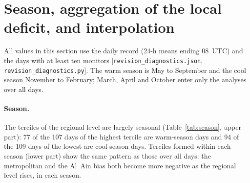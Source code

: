 \documentclass[11pt]{article}
\newcommand*{\ugm}{\ensuremath{\mu\mathrm{g\,m^{-3}}}}
\begin{document}
\begin{table}[p]\centering\footnotesize
\caption{As Table~3 of the main text, with a three-day guard. $q$ is corrected across the 24
comparisons of this run, which include the eight without time blocks.}
\label{tab:guard3}
\resizebox{\textwidth}{!}{}
\end{table}

\begin{table}[p]\centering\small
\caption{Leave-one-station-out gain (median $\Delta$ and number of monitors improved) of the
correction for four sets of predictors, without coordinates.}
\label{tab:features}

\end{table}

\clearpage
\section{Season, aggregation of the local deficit, and interpolation}

All values in this section use the daily record (24-h means ending 08~UTC) and the days with at
least ten monitors [\texttt{revision\_diagnostics.json}, \texttt{revision\_diagnostics.py}].
The warm season is May to September and the cool season November to February; March, April and
October enter only the analyses over all days.

\paragraph{Season.} The terciles of the regional level are largely seasonal
(Table~\ref{tab:season}, upper part): 77 of the 107 days of the highest tercile are warm-season
days and 94 of the 109 days of the lowest are cool-season days. Terciles formed within each season
(lower part) show the same pattern as those over all days: the metropolitan and the Al~Ain bias
both become more negative as the regional level rises, in each season.

\begin{table}[ht]\centering\small
\caption{Regional terciles by season. Upper part: season of the days in each tercile over all
days. Lower part: terciles formed within each season; regional level is the median over the days
of the tercile; bias (CAMS minus observed, \ugm{}) is the mean over monitor-days of the
metropolitan and the Al~Ain monitors, and the difference is metropolitan minus Al~Ain.}
\label{tab:season}

\end{table}
\end{document}
